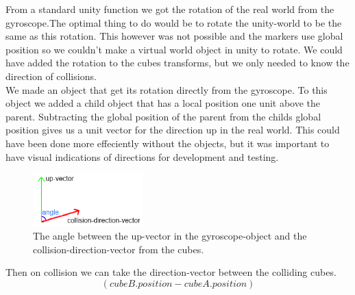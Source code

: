 From a standard unity function we got the rotation of the real world from the gyroscope.The optimal thing to do would be to rotate the unity-world to be the same as this rotation. This however was not possible and the markers use global position so we couldn't make a virtual world object in unity to rotate. We could have added the rotation to the cubes transforms, but we only needed to know the direction of collisions. \\
We made an object that get its rotation directly from the gyroscope. To this object we added a child object that has a local position one unit above the parent. Subtracting the global position of the parent from the childs global position gives us a unit vector for the direction up in the real world. This could have been done more effeciently without the objects, but it was important to have visual indications of directions for development and testing.\\

\begin{figure}
        \capstart
        \centering
        \vspace{-10pt}
        \includegraphics[width=0.38\textwidth]{images/CollisionDirectionAngleModel.png}
        \vspace{-10pt}
        \caption[Model for finding the angle between the vectors]{The angle between the up-vector in the gyroscope-object and the collision-direction-vector from the cubes.}
        \vspace{-10pt}
        \label{fig:Vector_Angle_model}
\end{figure}

Then on collision we can take the direction-vector between the colliding cubes. 
\[
(cubeB.position - cubeA.position)
\]


